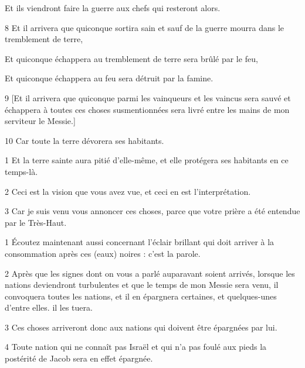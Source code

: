 \par Et ils viendront faire la guerre aux chefs qui resteront alors.

\par 8 Et il arrivera que quiconque sortira sain et sauf de la guerre mourra dans le tremblement de terre,

\par Et quiconque échappera au tremblement de terre sera brûlé par le feu,

\par Et quiconque échappera au feu sera détruit par la famine.

\par 9 [Et il arrivera que quiconque parmi les vainqueurs et les vaincus sera sauvé et échappera à toutes ces choses susmentionnées sera livré entre les mains de mon serviteur le Messie.]

\par 10 Car toute la terre dévorera ses habitants.


\par 1 Et la terre sainte aura pitié d'elle-même, et elle protégera ses habitants en ce temps-là.

\par 2 Ceci est la vision que vous avez vue, et ceci en est l'interprétation.

\par 3 Car je suis venu vous annoncer ces choses, parce que votre prière a été entendue par le Très-Haut.


\par 1 Écoutez maintenant aussi concernant l'éclair brillant qui doit arriver à la consommation après ces (eaux) noires : c'est la parole.

\par 2 Après que les signes dont on vous a parlé auparavant soient arrivés, lorsque les nations deviendront turbulentes et que le temps de mon Messie sera venu, il convoquera toutes les nations, et il en épargnera certaines, et quelques-unes d'entre elles. il les tuera.

\par 3 Ces choses arriveront donc aux nations qui doivent être épargnées par lui.

\par 4 Toute nation qui ne connaît pas Israël et qui n'a pas foulé aux pieds la postérité de Jacob sera en effet épargnée.

